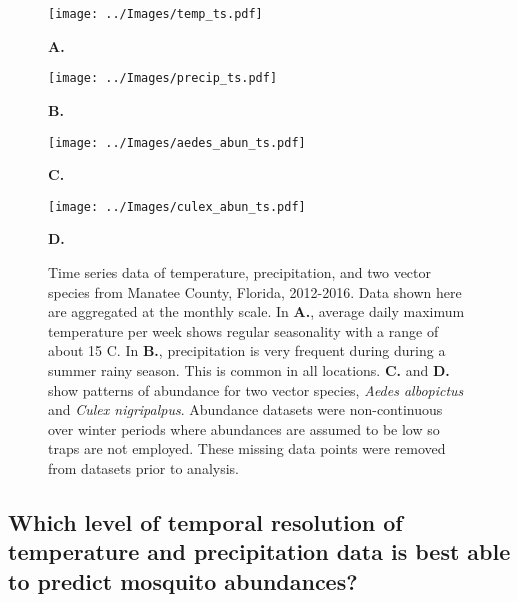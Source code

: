 \begin{figure}[h!]
	\begin{minipage}[]{.48\textwidth}
		\texttt{[image: ../Images/temp\_ts.pdf]}
		
		\hspace{4.3cm}\textbf{A.}\\
	\end{minipage}
	\begin{minipage}[]{.52\textwidth}
		\texttt{[image: ../Images/precip\_ts.pdf]}
		
		\hspace{4.4cm}\textbf{B.}\\
	\end{minipage}
	
	
	\begin{minipage}[]{.5\textwidth}
		\texttt{[image: ../Images/aedes\_abun\_ts.pdf]}
		
		\hspace{4.3cm}\textbf{C.}\\
	\end{minipage}
	\begin{minipage}[]{.5\textwidth}
		\texttt{[image: ../Images/culex\_abun\_ts.pdf]}
		
		\hspace{4.5cm}\textbf{D.}\\
	\end{minipage}
	
	\caption{Time series data of temperature, precipitation, and two vector species from Manatee County, Florida, 2012-2016. Data shown here are aggregated at the monthly scale. In \textbf{A.}, average daily maximum temperature per week shows regular seasonality with a range of about 15 \degree C. In \textbf{B.}, precipitation is very frequent during during a summer rainy season. This is common in all locations. \textbf{C.} and \textbf{D.} show patterns of abundance for two vector species, \textit{Aedes albopictus} and \textit{Culex nigripalpus}. Abundance datasets were non-continuous over winter periods where abundances are assumed to be low so traps are not employed. These missing data points were removed from datasets prior to analysis.}
	\label{fig: ts_plots}
\end{figure}

\subsection{Which level of temporal resolution of temperature and precipitation data is best able to predict mosquito abundances?}

